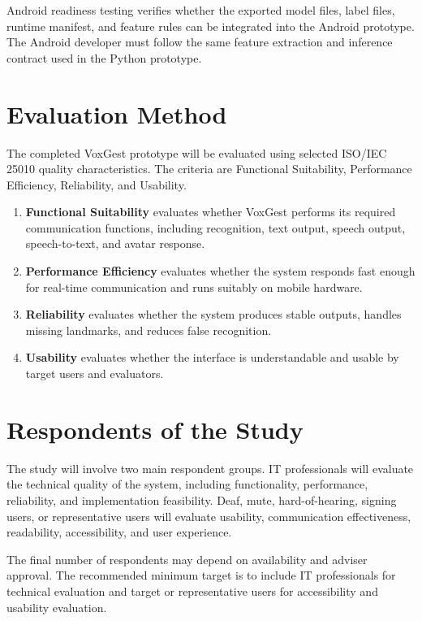 Android readiness testing verifies whether the exported model files, label files, runtime manifest, and feature rules can be integrated into the Android prototype. The Android developer must follow the same feature extraction and inference contract used in the Python prototype.

\section{Evaluation Method}

The completed VoxGest prototype will be evaluated using selected ISO/IEC 25010 quality characteristics. The criteria are Functional Suitability, Performance Efficiency, Reliability, and Usability.

\begin{enumerate}
    \item \textbf{Functional Suitability} evaluates whether VoxGest performs its required communication functions, including recognition, text output, speech output, speech-to-text, and avatar response.
    \item \textbf{Performance Efficiency} evaluates whether the system responds fast enough for real-time communication and runs suitably on mobile hardware.
    \item \textbf{Reliability} evaluates whether the system produces stable outputs, handles missing landmarks, and reduces false recognition.
    \item \textbf{Usability} evaluates whether the interface is understandable and usable by target users and evaluators.
\end{enumerate}

\section{Respondents of the Study}

The study will involve two main respondent groups. IT professionals will evaluate the technical quality of the system, including functionality, performance, reliability, and implementation feasibility. Deaf, mute, hard-of-hearing, signing users, or representative users will evaluate usability, communication effectiveness, readability, accessibility, and user experience.

The final number of respondents may depend on availability and adviser approval. The recommended minimum target is to include IT professionals for technical evaluation and target or representative users for accessibility and usability evaluation.

